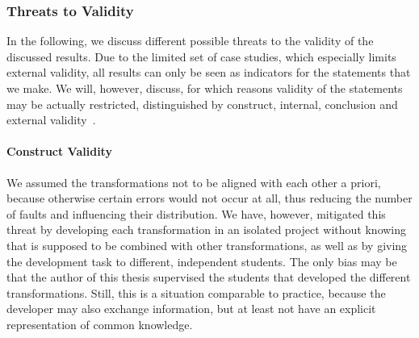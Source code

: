 




\subsubsection{Threats to Validity}

In the following, we discuss different possible threats to the validity of the discussed results.
Due to the limited set of case studies, which especially limits external validity, all results can only be seen as indicators for the statements that we make.
We will, however, discuss, for which reasons validity of the statements may be actually restricted, distinguished by construct, internal, conclusion and external validity~\cite{wohlin2012validity-Book}. %

\paragraph{Construct Validity}
We assumed the transformations not to be aligned with each other a priori, because otherwise certain errors would not occur at all, thus reducing the number of faults and influencing their distribution.
We have, however, mitigated this threat by developing each transformation in an isolated project without knowing that is supposed to be combined with other transformations, as well as by giving the development task to different, independent students.
The only bias may be that the author of this thesis supervised the students that developed the different transformations.
Still, this is a situation comparable to practice, because the developer may also exchange information, but at least not have an explicit representation of common knowledge.

